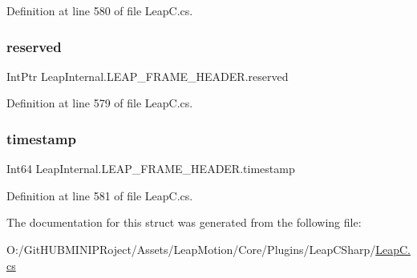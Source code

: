 Definition at line 580 of file Leap\+C.\+cs.

\mbox{\label{struct_leap_internal_1_1_l_e_a_p___f_r_a_m_e___h_e_a_d_e_r_aaf345ecbfcdceced3935ccb76d35c871}} 
\subsubsection{\texorpdfstring{reserved}{reserved}}
{\footnotesize\ttfamily Int\+Ptr Leap\+Internal.\+L\+E\+A\+P\+\_\+\+F\+R\+A\+M\+E\+\_\+\+H\+E\+A\+D\+E\+R.\+reserved}



Definition at line 579 of file Leap\+C.\+cs.

\mbox{\label{struct_leap_internal_1_1_l_e_a_p___f_r_a_m_e___h_e_a_d_e_r_a5d251bc27fa45a5da9b9a31f92d2835e}} 
\subsubsection{\texorpdfstring{timestamp}{timestamp}}
{\footnotesize\ttfamily Int64 Leap\+Internal.\+L\+E\+A\+P\+\_\+\+F\+R\+A\+M\+E\+\_\+\+H\+E\+A\+D\+E\+R.\+timestamp}



Definition at line 581 of file Leap\+C.\+cs.



The documentation for this struct was generated from the following file\+:\begin{DoxyCompactItemize}
\item 
O\+:/\+Git\+H\+U\+B\+M\+I\+N\+I\+P\+Roject/\+Assets/\+Leap\+Motion/\+Core/\+Plugins/\+Leap\+C\+Sharp/\mbox{\hyperlink{_leap_c_8cs}{Leap\+C.\+cs}}\end{DoxyCompactItemize}
